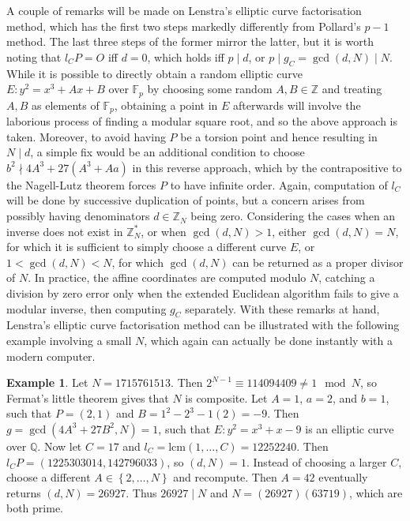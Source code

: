 \documentclass{article}
\newcommand{\F}{\mathbb{F}}
\newcommand{\Z}{\mathbb{Z}}
\newcommand{\Q}{\mathbb{Q}}
\newcommand{\rb}[1]{\left( #1 \right)}
\newcommand{\cb}[1]{\left\{ #1 \right\}}
\theoremstyle{definition}\newtheorem*{definition}{Definition}
\theoremstyle{definition}\newtheorem*{example}{Example}
\theoremstyle{definition}\newtheorem*{remark}{Remark}
\begin{document}
A couple of remarks will be made on Lenstra's elliptic curve factorisation method, which has the first two steps markedly differently from Pollard's $ p - 1 $ method. The last three steps of the former mirror the latter, but it is worth noting that $ l_CP = O $ iff $ d = 0 $, which holds iff $ p \mid d $, or $ p \mid g_C = \gcd\rb{d, N} \mid N $. While it is possible to directly obtain a random elliptic curve $ E : y^2 = x^3 + Ax + B $ over $ \F_p $ by choosing some random $ A, B \in \Z $ and treating $ A, B $ as elements of $ \F_p $, obtaining a point in $ E $ afterwards will involve the laborious process of finding a modular square root, and so the above approach is taken. Moreover, to avoid having $ P $ be a torsion point and hence resulting in $ N \mid d $, a simple fix would be an additional condition to choose $ b^2 \nmid 4A^3 + 27\rb{A^3 + Aa} $ in this reverse approach, which by the contrapositive to the Nagell-Lutz theorem forces $ P $ to have infinite order. Again, computation of $ l_C $ will be done by successive duplication of points, but a concern arises from possibly having denominators $ d \in \Z_N $ being zero. Considering the cases when an inverse does not exist in $ \Z_N^* $, or when $ \gcd\rb{d, N} > 1 $, either $ \gcd\rb{d, N} = N $, for which it is sufficient to simply choose a different curve $ E $, or $ 1 < \gcd\rb{d, N} < N $, for which $ \gcd\rb{d, N} $ can be returned as a proper divisor of $ N $. In practice, the affine coordinates are computed modulo $ N $, catching a division by zero error only when the extended Euclidean algorithm fails to give a modular inverse, then computing $ g_C $ separately. With these remarks at hand, Lenstra's elliptic curve factorisation method can be illustrated with the following example involving a small $ N $, which again can actually be done instantly with a modern computer.

\begin{example}
Let $ N = 1715761513 $. Then $ 2^{N - 1} \equiv 114094409 \ne 1 \mod N $, so Fermat's little theorem gives that $ N $ is composite. Let $ A = 1 $, $ a = 2 $, and $ b = 1 $, such that $ P = \rb{2, 1} $ and $ B = 1^2 - 2^3 - 1\rb{2} = -9 $. Then $ g = \gcd\rb{4A^3 + 27B^2, N} = 1 $, such that $ E : y^2 = x^3 + x - 9 $ is an elliptic curve over $ \Q $. Now let $ C = 17 $ and $ l_C = \text{lcm}\rb{1, \dots, C} = 12252240 $. Then $ l_CP = \rb{1225303014, 142796033} $, so $ \rb{d, N} = 1 $. Instead of choosing a larger $ C $, choose a different $ A \in \cb{2, \dots, N} $ and recompute. Then $ A = 42 $ eventually returns $ \rb{d, N} = 26927 $. Thus $ 26927 \mid N $ and $ N = \rb{26927}\rb{63719} $, which are both prime.
\end{example}
\end{document}
